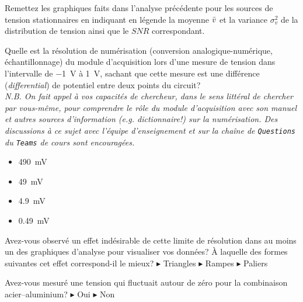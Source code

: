 \documentclass[canadien,12pt,oneside,letterpaper]{article}
\begin{document}
\begin{gradescope}
\item Remettez les graphiques faits dans l'analyse précédente pour les sources de tension stationnaires en indiquant en légende la moyenne $\Bar{v}$ et la variance $\sigma_v^2$ de la distribution de tension ainsi que le $SNR$ correspondant.
\item Quelle est la résolution de numérisation (conversion analogique-numérique, échantillonnage) du module d'acquisition lors d'une mesure de tension dans l'intervalle de \qty{-1}{\volt} à \qty{1}{\volt}, sachant que cette mesure est une différence (\textit{differential}) de potentiel entre deux points du circuit?\\ \textit{\footnotesize N.B. On fait appel à vos capacités de chercheur, dans le sens littéral de chercher par vous-même, pour comprendre le rôle du module d'acquisition avec son manuel et autres sources d'information (\emph{e.g.} dictionnaire!) sur la numérisation. Des discussions à ce sujet avec l'équipe d'enseignement et sur la chaîne de \texttt{Questions} du \texttt{Teams} de cours sont encouragées.}
        \begin{itemize}[label=$\blacktriangleright$]
        \item \qty{490}{\mV}
        \item \qty{49}{\mV}
        \item \qty{4.9}{\mV}
        \item \qty{0.49}{\mV}
        \end{itemize}
    \item Avez-vous observé un effet indésirable de cette limite de résolution dans au moins un des graphiques d'analyse pour visualiser vos données? À laquelle des formes suivantes cet effet correspond-il le mieux? $\blacktriangleright$ Triangles $\blacktriangleright$ Rampes $\blacktriangleright$ Paliers %
    \begin{gradescope}
    \setcounter{gradescopei}{2}
    \item Avez-vous mesuré une tension qui fluctuait autour de zéro pour la combinaison acier--aluminium? $\blacktriangleright$ Oui $\blacktriangleright$ Non

\end{gradescope}
\end{gradescope}
\end{document}
